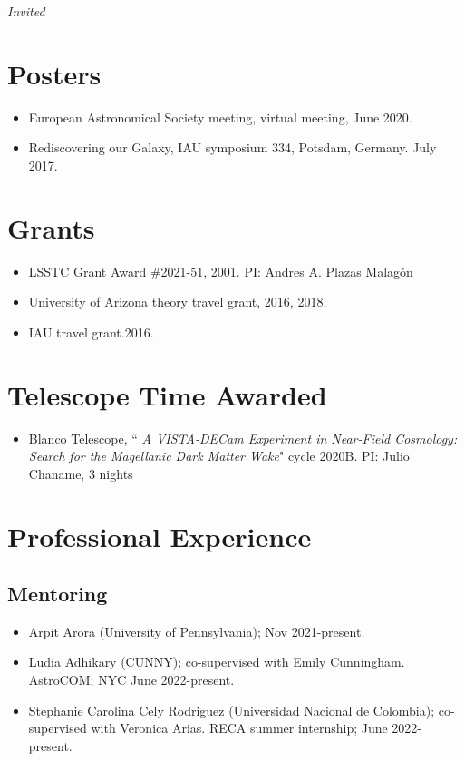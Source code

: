 \documentclass[UTF8]{article}
\begin{document}
\indent \dag \textit{Invited}

\section*{Posters}
\begin{itemize}
\setlength\itemsep{0.0em}
\renewcommand\labelitemi{$\cdot$}
  \item European Astronomical Society meeting, virtual meeting, June 2020.
  \item Rediscovering our Galaxy, IAU symposium 334, Potsdam, Germany. July 2017.
\end{itemize}

\section*{Grants}
\begin{itemize}
\setlength\itemsep{0.0em}
\renewcommand\labelitemi{$\cdot$}
\item LSSTC Grant Award \#2021-51, 2001. PI: Andres A. Plazas Malag\'on
\item University of Arizona theory travel grant, 2016, 2018. 
\item IAU travel grant.2016.
\end{itemize}

\section*{Telescope Time Awarded}
\begin{itemize}
  \setlength\itemsep{0.0em}
  \renewcommand\labelitemi{$\cdot$}
\item Blanco Telescope, ``\textit{ A VISTA-DECam Experiment in Near-Field
  Cosmology: Search for the Magellanic Dark Matter Wake}" cycle 2020B. PI: Julio Chaname, 3 nights 
\end{itemize}


\section*{Professional Experience}

\subsection*{Mentoring}

\begin{itemize}
  \setlength\itemsep{0.0em}
  \renewcommand\labelitemi{$\cdot$}
  \item Arpit Arora (University of Pennsylvania); Nov 2021-present.
  \item Ludia Adhikary (CUNNY); co-supervised with Emily Cunningham. AstroCOM; NYC June 2022-present.
\item Stephanie Carolina Cely Rodriguez (Universidad Nacional de Colombia); co-supervised with Veronica Arias. RECA
  summer internship; June 2022-present.
\end{itemize}
\end{document}
